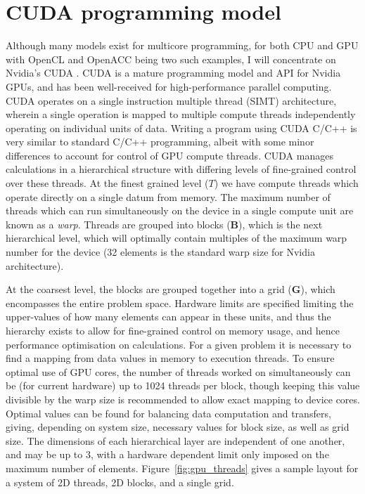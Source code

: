 \section{CUDA programming model}\label{sec:cuda_prog}
Although many models exist for multicore programming, for both CPU and GPU with OpenCL and OpenACC being two such examples, I will concentrate on Nvidia's CUDA \cite{NUM:Nickolls_cuda_2008}. CUDA is a mature programming model and API for Nvidia GPUs, and has been well-received for high-performance parallel computing. CUDA operates on a single instruction multiple thread (SIMT) architecture, wherein a single operation is mapped to multiple compute threads independently operating on individual units of data. Writing a program using CUDA C/C++ is very similar to standard C/C++ programming, albeit with some minor differences to account for control of GPU compute threads. CUDA manages calculations in a hierarchical structure with differing levels of fine-grained control over these threads. At the finest grained level ($T$) we have compute threads which operate directly on a single datum from memory. The maximum number of threads which can run simultaneously on the device in a single compute unit are known as a \textit{warp}. Threads are grouped into blocks ($\mathbf{B}$), which is the next hierarchical level, which will optimally contain multiples of the maximum warp number for the device (32 elements is the standard warp size for Nvidia architecture).

At the coarsest level, the blocks are grouped together into a grid ($\mathbf{G}$), which encompasses the entire problem space. Hardware limits are specified limiting the upper-values of how many elements can appear in these units, and thus the hierarchy exists to allow for fine-grained control on memory usage, and hence performance optimisation on calculations. For a given problem it is necessary to find a mapping from data values in memory to execution threads. To ensure optimal use of GPU cores, the number of threads worked on simultaneously can be (for current hardware) up to 1024 threads per block, though keeping this value divisible by the warp size is recommended to allow exact mapping to device cores. Optimal values can be found for balancing data computation and transfers, giving, depending on system size, necessary values for block size, as well as grid size. The dimensions of each hierarchical layer are independent of one another, and may be up to 3, with a hardware dependent limit only imposed on the maximum number of elements. Figure~\ref{fig:gpu_threads} gives a sample layout for a system of 2D threads, 2D blocks, and a single grid.

